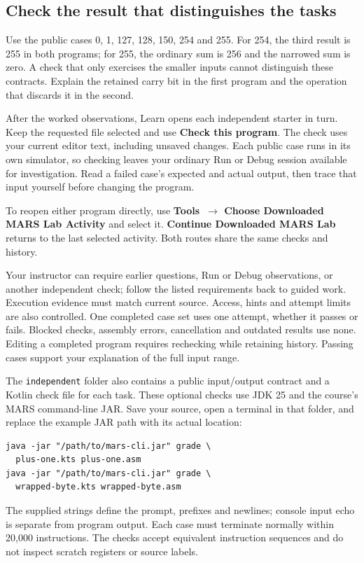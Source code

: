 \subsection{Check the result that distinguishes the tasks}

Use the public cases 0, 1, 127, 128, 150, 254 and 255. For 254, the third result
is 255 in both programs; for 255, the ordinary sum is 256 and the narrowed sum
is zero. A check that only exercises the smaller inputs cannot distinguish
these contracts. Explain the retained carry bit in the first program and the
operation that discards it in the second.

After the worked observations, Learn opens each independent starter in turn.
Keep the requested file selected and use \textbf{Check this program}. The check
uses your current editor text, including unsaved changes. Each public case runs
in its own simulator, so checking leaves your ordinary Run or Debug session
available for investigation. Read a failed case's expected and actual output,
then trace that input yourself before changing the program.

To reopen either program directly, use
\textbf{Tools~\(\to\) Choose Downloaded MARS Lab Activity} and select it.
\textbf{Continue Downloaded MARS Lab} returns to the last selected activity.
Both routes share the same checks and history.

Your instructor can require earlier questions, Run or Debug observations, or
another independent check; follow the listed requirements back to guided work.
Execution evidence must match current source. Access, hints and attempt limits
are also controlled. One completed case set uses one attempt, whether it passes
or fails. Blocked checks, assembly errors, cancellation and outdated results use
none. Editing a completed program requires rechecking while retaining history.
Passing cases support your explanation of the full input range.

The \texttt{independent} folder also contains a public input/output contract and a
Kotlin check file for each task. These optional checks use JDK 25 and the
course's MARS command-line JAR. Save your source, open a terminal in that folder,
and replace the example JAR path with its actual location:

\begin{verbatim}
java -jar "/path/to/mars-cli.jar" grade \
  plus-one.kts plus-one.asm
java -jar "/path/to/mars-cli.jar" grade \
  wrapped-byte.kts wrapped-byte.asm
\end{verbatim}

The supplied strings define the prompt, prefixes and newlines; console input
echo is separate from program output. Each case must terminate normally within
20,000 instructions. The checks accept equivalent instruction sequences and do
not inspect scratch registers or source labels.
